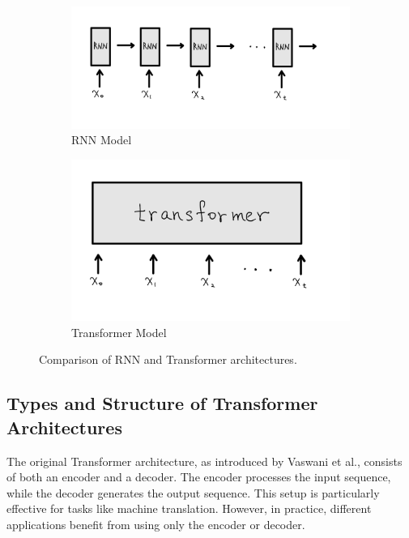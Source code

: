 \begin{figure}[ht]
    \centering
    \begin{subfigure}[b]{0.45\textwidth}
        \centering
        \includegraphics[width=\textwidth]{Figures/rnn.jpeg}
        \caption{RNN Model}
        \label{fig:rnn}
    \end{subfigure}
    \hfill
    \begin{subfigure}[b]{0.45\textwidth}
        \centering
        \includegraphics[width=\textwidth]{Figures/transformer.jpeg}
        \caption{Transformer Model}
        \label{fig:transformer}
    \end{subfigure}
    \caption{Comparison of RNN and Transformer architectures.}
    \label{fig:comparison}
\end{figure}

\subsection{Types and Structure of Transformer Architectures}
The original Transformer architecture, as introduced by Vaswani et al., consists of both an encoder and a decoder. The encoder processes the input sequence, while the decoder generates the output sequence. This setup is particularly effective for tasks like machine translation. However, in practice, different applications benefit from using only the encoder or decoder.

